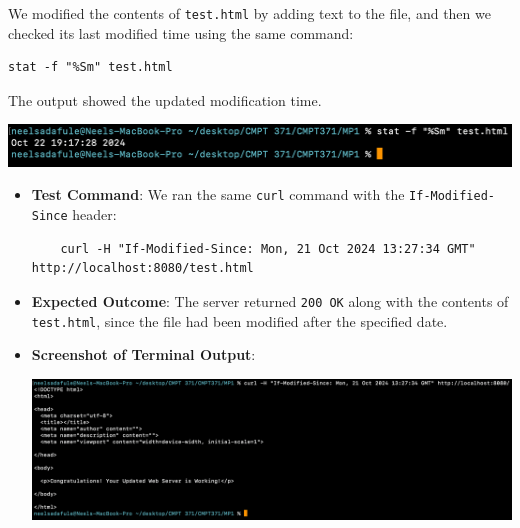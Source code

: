 \documentclass{article}
\begin{document}
We modified the contents of \texttt{test.html} by adding text to the file, and then we checked its last modified time using the same command:
\begin{lstlisting}
stat -f "%Sm" test.html
\end{lstlisting}
The output showed the updated modification time.

\begin{center}
    \includegraphics[width=\textwidth]{screenshots/check_modified.png}  %
\end{center}

\begin{itemize}
    \item \textbf{Test Command}: We ran the same \texttt{curl} command with the \texttt{If-Modified-Since} header:
    \begin{lstlisting}
    curl -H "If-Modified-Since: Mon, 21 Oct 2024 13:27:34 GMT" http://localhost:8080/test.html
    \end{lstlisting}

    \item \textbf{Expected Outcome}: The server returned \texttt{200 OK} along with the contents of \texttt{test.html}, since the file had been modified after the specified date.

    \item \textbf{Screenshot of Terminal Output}:
    \begin{center}
        \includegraphics[width=\textwidth]{screenshots/200_OK_after_modification.png}  %
    \end{center}
\end{itemize}
\end{document}
